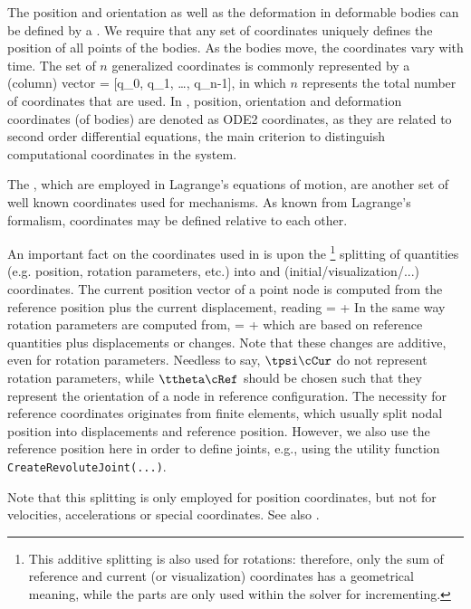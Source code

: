 The position and orientation as well as the deformation in deformable bodies can be defined by a . We require that any set of coordinates uniquely defines the position of all points of the bodies.
As the bodies move, the coordinates vary with time.
The set of $n$ generalized coordinates is commonly represented by a (column) vector
\be
  \qv = [q_0, q_1, \ldots, q_{n-1}]\tp,
\ee
in which $n$ represents the total number of coordinates that are used. 
In \codeName, position, orientation and deformation coordinates (of bodies) are denoted as \ac{ODE2} coordinates, as they are related to second order differential equations, the main criterion to distinguish computational coordinates in the system.

The , which are employed in Lagrange's equations of motion, are another set of well known coordinates used for mechanisms. As known from Lagrange's formalism, coordinates may be defined relative to each other.

%
An important fact on the coordinates used in \codeName is upon the \footnote{This additive splitting is also used for rotations: therefore, only the sum of reference and current (or visualization) coordinates has a geometrical meaning, while the parts are only used within the solver for incrementing.} splitting of quantities (e.g. position, rotation parameters, etc.) into  and  (initial/visualization/...) coordinates.
The current position vector of a point node is computed from the reference position plus the current displacement, reading
\be
  \pv\cCur = \pv\cRef + \uv\cCur
\ee
In the same way rotation parameters are computed from,
\be
  \ttheta\cCur = \ttheta\cRef + \tpsi\cCur
\ee
which are based on reference quantities plus displacements or changes. Note that these changes are additive, even for rotation parameters. Needless to say, $\tpsi\cCur$ do not represent rotation parameters, while $\ttheta\cRef$ should be chosen such that they represent the orientation of a node in reference configuration.
The necessity for reference coordinates originates from finite elements, which usually split nodal position into displacements and reference position.
However, we also use the reference position here in order to define joints, e.g., using the utility function \texttt{CreateRevoluteJoint(...)}.

Note that this splitting is only employed for position coordinates, but not for velocities, accelerations or special coordinates. See also .


